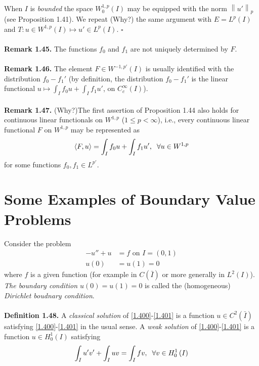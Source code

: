 \documentclass[a4paper,oneside]{book}
\numberwithin{equation}{chapter}
\begin{document}
When $I$ is \textit{bounded} the space $W_0^{1,p}\left(I\right)$ may be equipped with the norm ${\left\| {u'} \right\|_p}$ (see Proposition 1.41). We repeat  (Why?) the same argument with $E=L^p\left(I\right)$ and $T:u \in {W^{1,p}}\left( I \right) \mapsto u' \in {L^p}\left( I \right)$. \hfill $\square$\\
\\
\textbf{Remark 1.45.} The functions $f_0$ and $f_1$ are not uniquely determined by $F$.\\
\\
\textbf{Remark 1.46.} The element $F\in W^{-1,p'}\left(I\right)$ is usually identified with the distribution $f_0-f_1'$ (by definition, the distribution $f_0-f_1'$ is the linear functional $u \mapsto \int_I {{f_0}u}  + \int_I {{f_1}u'} $, on $C_c^{\infty} \left(I\right)$).\\
\\
\textbf{Remark 1.47.}  (Why?)The first assertion of Proposition  1.44 also holds for continuous linear functionals on $W^{1,p}$ ($1\le p<\infty$), i.e., every continuous linear functional $F$ on $W^{1,p}$ may be represented as
\begin{align}
\left\langle {F,u} \right\rangle  = \int_I {{f_0}u}  + \int_I {{f_1}u'} ,\hspace{0.2cm}\forall u \in {W^{1,p}}
\end{align}
for some functions $f_0,f_1\in L^{p'}$.
\section{Some Examples of Boundary Value Problems}
Consider the problem
\begin{align}
\label{1.400}
 - u'' + u &= f\mbox{ on } I = \left( {0,1} \right)\\
u\left( 0 \right) &= u\left( 1 \right) = 0 \label{1.401}
\end{align}
where $f$ is a given function (for example in $C\left(\bar I\right)$ or more generally in $L^2\left(I\right)$). \textit{The boundary condition $u\left(0\right)=u\left(1\right)=0$} is called the (homogeneous) \textit{Dirichlet boudnary condition}.\\
\\
\textbf{Definition 1.48.} A \textit{classical solution} of \eqref{1.400}-\eqref{1.401} is a function $u\in C^2\left(\bar I\right)$ satisfying \eqref{1.400}-\eqref{1.401} in the usual sense. A \textit{weak solution} of \eqref{1.400}-\eqref{1.401} is a function $u\in H_0^1\left(I\right)$ satisfying
\begin{align}
\label{1.402}
\int_I {u'v'}  + \int_I {uv}  = \int_I {fv} ,\hspace{0.2cm}\forall v \in H_0^1\left( I \right)
\end{align}
\end{document}
